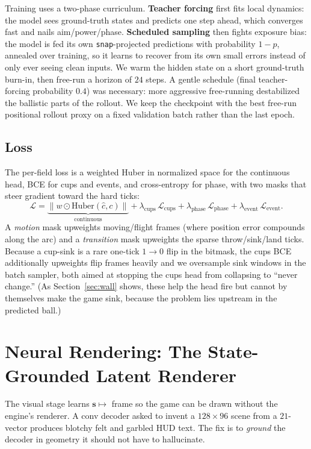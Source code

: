 \documentclass[11pt]{article}
\newcommand{\vect}[1]{\mathbf{#1}}
\newcommand{\stt}{\vect{s}}
\newcommand{\code}[1]{\texttt{#1}}
\begin{document}
Training uses a two-phase curriculum. \textbf{Teacher forcing} first fits local dynamics: the model sees ground-truth states and predicts one step ahead, which converges fast and nails aim/power/phase. \textbf{Scheduled sampling} \cite{scheduledsampling} then fights exposure bias: the model is fed its own \code{snap}-projected predictions with probability $1-p$, annealed over training, so it learns to recover from its own small errors instead of only ever seeing clean inputs. We warm the hidden state on a short ground-truth burn-in, then free-run a horizon of $24$ steps. A gentle schedule (final teacher-forcing probability $0.4$) was necessary: more aggressive free-running destabilized the ballistic parts of the rollout. We keep the checkpoint with the best free-run positional rollout proxy on a fixed validation batch rather than the last epoch.

\subsection{Loss}

The per-field loss is a weighted Huber in normalized space for the continuous head, BCE for cups and events, and cross-entropy for phase, with two masks that steer gradient toward the hard ticks:
\begin{equation}
    \mathcal{L} = \underbrace{\big\| w \odot \mathrm{Huber}(\hat{c},c)\big\|}_{\text{continuous}}
    + \lambda_{\text{cups}}\,\mathcal{L}_{\text{cups}}
    + \lambda_{\text{phase}}\,\mathcal{L}_{\text{phase}}
    + \lambda_{\text{event}}\,\mathcal{L}_{\text{event}}.
\end{equation}
A \emph{motion} mask upweights moving/flight frames (where position error compounds along the arc) and a \emph{transition} mask upweights the sparse throw/sink/land ticks. Because a cup-sink is a rare one-tick $1\!\to\!0$ flip in the bitmask, the cups BCE additionally upweights flip frames heavily and we oversample sink windows in the batch sampler, both aimed at stopping the cups head from collapsing to ``never change.'' (As Section~\ref{sec:wall} shows, these help the head fire but cannot by themselves make the game sink, because the problem lies upstream in the predicted ball.)

\section{Neural Rendering: The State-Grounded Latent Renderer}

The visual stage learns $\stt\mapsto$ frame so the game can be drawn without the engine's renderer. A conv decoder asked to invent a $128\times96$ scene from a $21$-vector produces blotchy felt and garbled HUD text. The fix is to \emph{ground} the decoder in geometry it should not have to hallucinate.
\end{document}
